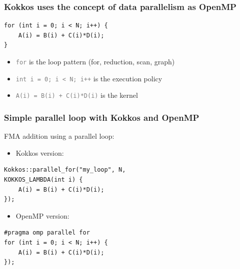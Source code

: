 \documentclass[aspectratio=169]{beamer}
\begin{document}


\begin{frame}[fragile]
    \frametitle{Kokkos uses the concept of data parallelism as OpenMP} 


\begin{verbatim}
for (int i = 0; i < N; i++) {
    A(i) = B(i) + C(i)*D(i);
}
\end{verbatim}

\begin{itemize}
    \item \textcolor{gray}{\texttt{for}} is the loop pattern (for, reduction, scan, graph)
    \item \textcolor{gray}{\texttt{int i = 0; i < N; i++}} is the execution policy
    \item \textcolor{gray}{\texttt{A(i) = B(i) + C(i)*D(i)}} is the kernel
\end{itemize}

\end{frame}


\begin{frame}[fragile]
    \frametitle{Simple parallel loop with Kokkos and OpenMP} 

FMA addition using a parallel loop:
\begin{itemize}
\item Kokkos version:
\end{itemize}

\small
\begin{verbatim}
Kokkos::parallel_for("my_loop", N, 
KOKKOS_LAMBDA(int i) {
    A(i) = B(i) + C(i)*D(i);
});
\end{verbatim}

\normalsize
\begin{itemize}
\item OpenMP version:
\end{itemize}
    
\small
\begin{verbatim}
#pragma omp parallel for
for (int i = 0; i < N; i++) {
    A(i) = B(i) + C(i)*D(i);
});
\end{verbatim}
\end{frame}
\end{document}
